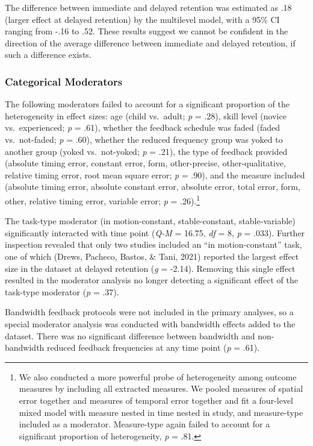 \documentclass[
  english,
  man, donotrepeattitle,mask,floatsintext]{apa7}
\begin{document}
The difference between immediate and delayed retention was estimated as .18 (larger effect at delayed retention) by the multilevel model, with a 95\% CI ranging from -.16 to .52. These results suggest we cannot be confident in the direction of the average difference between immediate and delayed retention, if such a difference exists.

\hypertarget{categorical-moderators}{%
\subsubsection{Categorical Moderators}\label{categorical-moderators}}

The following moderators failed to account for a significant proportion of the heterogeneity in effect sizes: age (child vs.~adult; \emph{p} = .28), skill level (novice vs.~experienced; \emph{p} = .61), whether the feedback schedule was faded (faded vs.~not-faded; \emph{p} = .60), whether the reduced frequency group was yoked to another group (yoked vs.~not-yoked; \emph{p} = .21), the type of feedback provided (absolute timing error, constant error, form, other-precise, other-qualitative, relative timing error, root mean square error; \emph{p} = .90), and the measure included (absolute timing error, absolute constant error, absolute error, total error, form, other, relative timing error, variable error; \emph{p} = .26).\footnote{We also conducted a more powerful probe of heterogeneity among outcome measures by including all extracted measures. We pooled measures of spatial error together and measures of temporal error together and fit a four-level mixed model with measure nested in time nested in study, and measure-type included as a moderator. Measure-type again failed to account for a significant proportion of heterogeneity, \emph{p} = .81.}

The task-type moderator (in motion-constant, stable-constant, stable-variable) significantly interacted with time point (\emph{Q-M} = 16.75, \emph{df} = 8, \emph{p} = .033). Further inspection revealed that only two studies included an ``in motion-constant'' task, one of which (Drews, Pacheco, Bastos, \& Tani, 2021) reported the largest effect size in the dataset at delayed retention (\emph{g} = -2.14). Removing this single effect resulted in the moderator analysis no longer detecting a significant effect of the task-type moderator (\emph{p} = .37).

Bandwidth feedback protocols were not included in the primary analyses, so a special moderator analysis was conducted with bandwidth effects added to the dataset. There was no significant difference between bandwidth and non-bandwidth reduced feedback frequencies at any time point (\emph{p} = .61).
\end{document}
